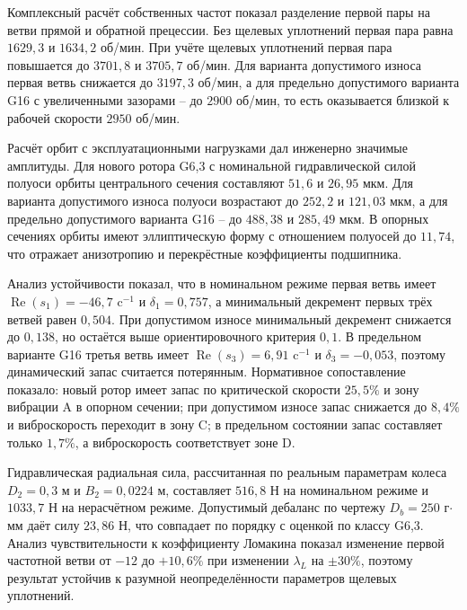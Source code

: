 Комплексный расчёт собственных частот показал разделение первой пары на ветви прямой и обратной прецессии. Без щелевых уплотнений первая пара равна $1629{,}3$ и $1634{,}2$ об/мин. При учёте щелевых уплотнений первая пара повышается до $3701{,}8$ и $3705{,}7$ об/мин. Для варианта допустимого износа первая ветвь снижается до $3197{,}3$ об/мин, а для предельно допустимого варианта G16 с увеличенными зазорами -- до $2900$ об/мин, то есть оказывается близкой к рабочей скорости $2950$ об/мин.

Расчёт орбит с эксплуатационными нагрузками дал инженерно значимые амплитуды. Для нового ротора G6,3 с номинальной гидравлической силой полуоси орбиты центрального сечения составляют $51{,}6$ и $26{,}95$ мкм. Для варианта допустимого износа полуоси возрастают до $252{,}2$ и $121{,}03$ мкм, а для предельно допустимого варианта G16 -- до $488{,}38$ и $285{,}49$ мкм. В опорных сечениях орбиты имеют эллиптическую форму с отношением полуосей до $11{,}74$, что отражает анизотропию и перекрёстные коэффициенты подшипника.

Анализ устойчивости показал, что в номинальном режиме первая ветвь имеет $\operatorname{Re}(s_1)=-46{,}7$ c$^{-1}$ и $\delta_1=0{,}757$, а минимальный декремент первых трёх ветвей равен $0{,}504$. При допустимом износе минимальный декремент снижается до $0{,}138$, но остаётся выше ориентировочного критерия $0{,}1$. В предельном варианте G16 третья ветвь имеет $\operatorname{Re}(s_3)=6{,}91$ c$^{-1}$ и $\delta_3=-0{,}053$, поэтому динамический запас считается потерянным. Нормативное сопоставление показало: новый ротор имеет запас по критической скорости $25{,}5\%$ и зону вибрации A в опорном сечении; при допустимом износе запас снижается до $8{,}4\%$ и виброскорость переходит в зону C; в предельном состоянии запас составляет только $1{,}7\%$, а виброскорость соответствует зоне D.

Гидравлическая радиальная сила, рассчитанная по реальным параметрам колеса $D_2=0{,}3$ м и $B_2=0{,}0224$ м, составляет $516{,}8$ Н на номинальном режиме и $1033{,}7$ Н на нерасчётном режиме. Допустимый дебаланс по чертежу $D_b=250$ г$\cdot$мм даёт силу $23{,}86$ Н, что совпадает по порядку с оценкой по классу G6,3. Анализ чувствительности к коэффициенту Ломакина показал изменение первой частотной ветви от $-12$ до $+10{,}6\%$ при изменении $\lambda_L$ на $\pm30\%$, поэтому результат устойчив к разумной неопределённости параметров щелевых уплотнений.
